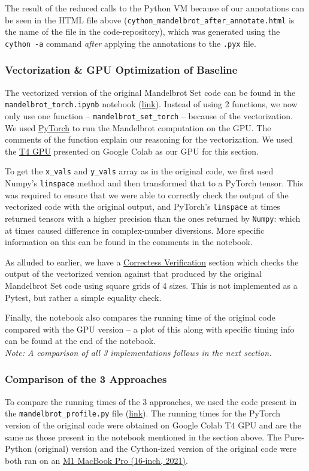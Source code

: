 \documentclass[a4paper,12pt]{article}
\begin{document}
The result of the reduced calls to the Python VM because of our annotations can be seen in the HTML file above (\verb|cython_mandelbrot_after_annotate.html| is the name of the file in the code-repository), which was generated using the \verb|cython -a| command \textit{after} applying the annotations to the \verb|.pyx| file.

\subsubsection{Vectorization \& GPU Optimization of Baseline}
The vectorized version of the original Mandelbrot Set code can be found in the \verb|mandelbrot_torch.ipynb| notebook (\href{https://github.com/paulmyr/DD2358-HPC25/blob/master/03_compgpu/bonus/mandelbrot_torch.ipynb}{link}). Instead of using 2 functions, we now only use one function -- \verb|mandelbrot_set_torch| -- because of the vectorization. We used \underline{PyTorch} to run the Mandelbrot computation on the GPU. The comments of the function explain our reasoning for the vectorization. We used the \underline{T4 GPU} presented on Google Colab as our GPU for this section.

To get the \verb|x_vals| and \verb|y_vals| array as in the original code, we first used Numpy's \verb|linspace| method and then transformed that to a PyTorch tensor. This was required to ensure that we were able to correctly check the output of the vectorized code with the original output, and PyTorch's \verb|linspace| at times returned tensors with a higher precision than the ones returned by \verb|Numpy|: which at times caused difference in complex-number diversions. More specific information on this can be found in the comments in the notebook. 

As alluded to earlier, we have a \underline{Correctess Verification} section which checks the output of the vectorized version against that produced by the original Mandelbrot Set code using square grids of 4 sizes. This is not implemented as a Pytest, but rather a simple equality check. 

Finally, the notebook also compares the running time of the original code compared with the GPU version -- a plot of this along with specific timing info can be found at the end of the notebook. \\
\textit{Note: A comparison of all 3 implementations follows in the next section.}

\subsubsection{Comparison of the 3 Approaches}
To compare the running times of the 3 approaches, we used the code present in the \verb|mandelbrot_profile.py| file (\href{https://github.com/paulmyr/DD2358-HPC25/blob/master/03_compgpu/bonus/mandelbrot_profile.py}{link}). The running times for the PyTorch version of the original code were obtained on Google Colab T4 GPU and are the same as those present in the notebook mentioned in the section above. The Pure-Python (original) version and the Cython-ized version of the original code were both ran on an \underline{M1 MacBook Pro (16-inch, 2021)}. 
\end{document}
